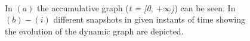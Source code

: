 \begin{figure}[h!tb]
   \hfill
  \\
  \hfill
    \hfill
  \caption{In $(a)$ the accumulative graph (\textit{t = [0, $+\infty$)}) can be seen. In $(b)-(i)$ different snapshots in given instants of time showing the evolution of the dynamic graph are depicted.}
  \label{fig:dynamic-graph-example}
\end{figure}

